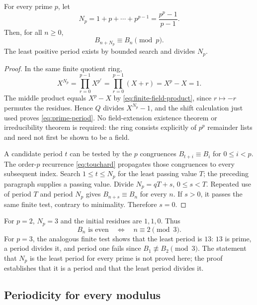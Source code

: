 \begin{theorem}\label{thm:prime-period}
For every prime $p$, let
\[
  N_p=1+p+\cdots+p^{p-1}=\frac{p^p-1}{p-1}.
\]
Then, for all $n\geq0$,
\begin{equation}\label{eq:prime-period}
 B_{n+N_p}\equiv B_n\pmod p.
\end{equation}
The least positive period exists by bounded search and divides $N_p$.
\end{theorem}
\begin{proof}
In the same finite quotient ring,
\[
 X^{N_p}=\prod_{r=0}^{p-1}X^{p^r}
       =\prod_{r=0}^{p-1}(X+r)=X^p-X=1.
\]
The middle product equals $X^p-X$ by
\eqref{eq:finite-field-product}, since $r\mapsto-r$ permutes the residues.
Hence $Q$ divides $X^{N_p}-1$, and the shift calculation just used proves
\eqref{eq:prime-period}. No field-extension existence theorem or
irreducibility theorem is required: the ring consists explicitly of $p^p$
remainder lists and need not first be shown to be a field.

A candidate period $t$ can be tested by the $p$ congruences
$B_{t+i}\equiv B_i$ for $0\leq i<p$. The order-$p$ recurrence
\eqref{eq:touchard} propagates those congruences to every subsequent index.
Search $1\leq t\leq N_p$ for the least passing value $T$; the preceding
paragraph supplies a passing value. Divide $N_p=qT+s$, $0\leq s<T$.
Repeated use of period $T$ and period $N_p$ gives
$B_{n+s}\equiv B_n$ for every $n$. If $s>0$, it passes the same finite test,
contrary to minimality. Therefore $s=0$.
\end{proof}

For $p=2$, $N_p=3$ and the initial residues are $1,1,0$. Thus
\begin{equation}\label{eq:bell-parity}
 B_n\text{ is even}\quad\Longleftrightarrow\quad n\equiv2\pmod3.
\end{equation}
For $p=3$, the analogous finite test shows that the least period is $13$:
$13$ is prime, a period divides it, and period one fails since
$B_1\not\equiv B_2\pmod3$. The statement that $N_p$ is the least period for
every prime is not proved here; the proof establishes that it is a period
and that the least period divides it.

\subsection{Periodicity for every modulus}

